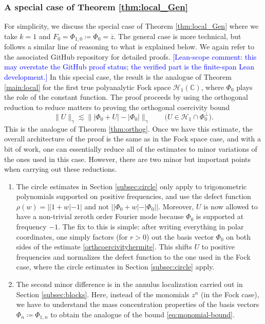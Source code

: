 \documentclass[11pt]{amsart}
\theoremstyle{remark}
\newcommand{\abs}[1]{\lvert #1 \rvert}
\newcommand{\norm}[1]{\lVert #1 \rVert}
\begin{document}
\subsubsection{A special case of Theorem \ref{thm:local_Gen}} For simplicity, we discuss the special case of Theorem \ref{thm:local_Gen} where we take $k=1$ and $F_0=\Phi_{1,0}\coloneq \Phi_0=\overline{z}$. The general case is more technical, but follows a similar line of reasoning to what is explained below. We again refer to the associated GitHub repository for detailed proofs.   \textcolor{blue}{[Lean-scope comment: this may overstate the GitHub proof status; the verified part is the finite-span Lean development.] } In this special case, the result is the analogue of Theorem \ref{main:local} for the first true polyanalytic Fock space $\mathcal{H}_1(\mathbb{C})$, where $\Phi_0$ plays the role of the constant function. The proof proceeds by using the orthogonal reduction to reduce matters to proving the orthogonal coercivity bound
\begin{equation}\label{orthcoercivityhermite}
\norm{U}_\gamma
\lesssim
\norm{\abs{\Phi_0 + U} - \abs{\Phi_0}}_\gamma
\qquad
\bigl(U \in \mathcal{H}_1 \cap \Phi_0^\perp\bigr).
\end{equation}
This is the analogue of Theorem \ref{thm:orthog}. Once we have this estimate, the overall architecture of the proof is the same as in the Fock space case, and with a bit of work, one can essentially reduce all of the estimates to minor variations of the ones used in this case. However, there are two minor but important points when carrying out these reductions.
\begin{enumerate}
\item The circle estimates in Section \ref{subsec:circle} only apply to trigonometric polynomials supported on positive frequencies, and use the defect function $\rho(w)=||1+w|-1|$ and not $||\Phi_0+w|-|\Phi_0||$. Moreover, $U$ is now allowed to have a non-trivial zeroth order Fourier mode because $\Phi_0$ is supported at frequency $-1$. The fix to this is simple: after writing everything in polar coordinates, one simply factors (for $r>0$) out the basis vector $\Phi_0$ on both sides of the estimate \eqref{orthcoercivityhermite}. This shifts $U$ to positive frequencies and normalizes the defect function to the one used in the Fock case, where the circle estimates in Section \ref{subsec:circle} apply.
\item The second minor difference is in the annulus localization carried out in Section \ref{subsec:blocks}. Here, instead of the monomials $z^n$ (in the Fock case), we have to understand the mass concentration properties of the basis vectors $\Phi_n\coloneq \Phi_{1,n}$ to obtain the analogue of the bound \eqref{eq:monomial-bound}.
\end{enumerate}
\end{document}
